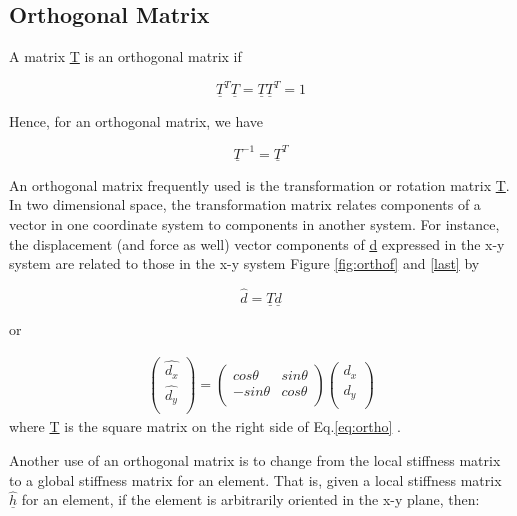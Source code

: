 \documentclass[12pt]{report}
\newcommand{\lab}[1]{
	Eq.\ref{#1}
}
\begin{document}
\subsection{Orthogonal Matrix}

A matrix \underline{T} is an orthogonal matrix if

\begin{equation}
	\underline{T}^T\underline{T} = \underline{T}\underline{T}^T=1
\end{equation}

Hence, for an orthogonal matrix, we have

\begin{equation}
	\underline{T}^{-1}=\underline{T}^T
\end{equation}

An orthogonal matrix frequently used is the transformation or rotation
matrix \underline{T}. In two dimensional space, the transformation matrix
relates components of a vector in one coordinate system to components
in another system. For instance, the displacement (and force as well)
vector components of \underline{d} expressed in the x-y system are related to
those in the x-y system Figure \ref{fig:orthof} and \ref{last} by

\begin{equation}
	\hat{d}=\underline{T}\underline{d}
\end{equation}

or

\begin{eqnarray}
	\left(\begin{array}{rr}
	\hat{d_{x}} \\
	\hat{d_{y}} \\
\end{array}\right) = \left(\begin{array}{rr}
	cos\theta & sin\theta \\
	-sin\theta & cos\theta  \\
\end{array}\right)
	\left(\begin{array}{rr}
	d_{x} \\
	d_{y} \\
\end{array}\right)
	\label{eq:ortho}
\end{eqnarray}
where \underline{T} is the square matrix on the right side of \lab{eq:ortho}.


Another use of an orthogonal matrix is to change from the local
stiffness matrix to a global stiffness matrix for an element. That is,
given a local stiffness matrix $\hat{\underline{h}}$ for an element, if the
element is arbitrarily oriented in the x-y plane, then:
\end{document}
